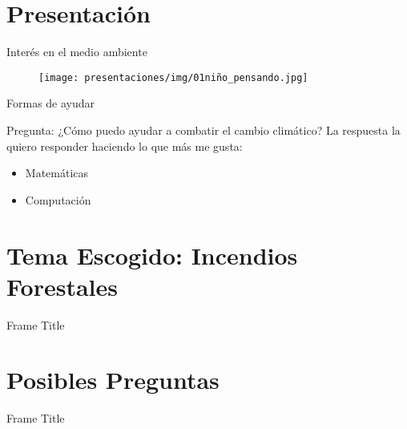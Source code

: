 \section{Presentación}
\begin{frame}{Interés en el medio ambiente}
\begin{figure}
    \centering
    \texttt{[image: presentaciones/img/01niño\_pensando.jpg]}
\end{figure}
\end{frame}

\begin{frame}{Formas de ayudar}
    \begin{block}{Pregunta: ¿Cómo puedo ayudar a combatir el cambio climático?}
    La respuesta la quiero responder haciendo lo que más me gusta:
    \begin{itemize}
        \item Matemáticas
        \item Computación
    \end{itemize}
    \end{block}
\end{frame}

\section{Tema Escogido: Incendios Forestales}
\begin{frame}{Frame Title}
    
\end{frame}

\section{Posibles Preguntas}
\begin{frame}{Frame Title}
    
\end{frame}


